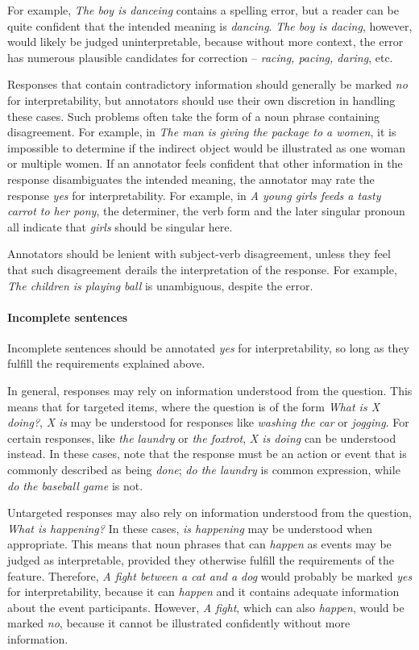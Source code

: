 \documentclass[12pt]{article}
\begin{document}
For example, \textit{The boy is danceing} contains a spelling error, but a reader can be quite confident that the intended meaning is \textit{dancing}. \textit{The boy is dacing}, however, would likely be judged uninterpretable, because without more context, the error has numerous plausible candidates for correction -- \textit{racing, pacing, daring}, etc.

Responses that contain contradictory information should generally be marked \textit{no} for interpretability, but annotators should use their own discretion in handling these cases. Such problems often take the form of a noun phrase containing disagreement. For example, in \textit{The man is giving the package to a women}, it is impossible to determine if the indirect object would be illustrated as one woman or multiple women. If an annotator feels confident that other information in the response disambiguates the intended meaning, the annotator may rate the response \textit{yes} for interpretability. For example, in \textit{A young girls feeds a tasty carrot to her pony}, the determiner, the verb form and the later singular pronoun all indicate that \textit{girls} should be singular here.

Annotators should be lenient with subject-verb disagreement, unless they feel that such disagreement derails the interpretation of the response. For example, \textit{The children is playing ball} is unambiguous, despite the error.

\paragraph{Incomplete sentences} \label{para:interp-incomplete} Incomplete sentences should be annotated \textit{yes} for interpretability, so long as they fulfill the requirements explained above.

In general, responses may rely on information understood from the question. This means that for targeted items, where the question is of the form \textit{What is X doing?}, \textit{X is} may be understood for responses like \textit{washing the car} or \textit{jogging}. For certain responses, like \textit{the laundry} or \textit{the foxtrot}, \textit{X is doing} can be understood instead. In these cases, note that the response must be an action or event that is commonly described as being \textit{done}; \textit{do the laundry} is common expression, while \textit{do the baseball game} is not. 

Untargeted responses may also rely on information understood from the question, \textit{What is happening?} In these cases, \textit{is happening} may be understood when appropriate. This means that noun phrases that can \textit{happen} as events may be judged as interpretable, provided they otherwise fulfill the requirements of the feature. Therefore, \textit{A fight between a cat and a dog} would probably be marked \textit{yes} for interpretability, because it can \textit{happen} and it contains adequate information about the event participants. However, \textit{A fight}, which can also \textit{happen}, would be marked \textit{no}, because it cannot be illustrated confidently without more information.
\end{document}
